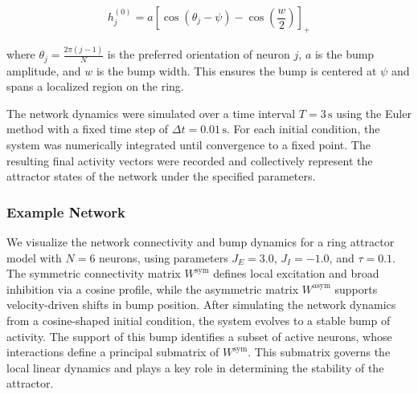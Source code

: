 \documentclass[11pt,a4paper]{article}
\begin{document}
\begin{equation}
h_j^{(0)} = a \left[\cos(\theta_j - \psi) - \cos\left(\frac{w}{2}\right)\right]_+
\end{equation}


where $\theta_j = \frac{2\pi(j-1)}{N}$ is the preferred orientation of neuron $j$, $a$ is the bump amplitude, and $w$ is the bump width. This ensures the bump is centered at $\psi$ and spans a localized region on the ring.

The network dynamics were simulated over a time interval $T = 3\,\text{s}$ using the Euler method with a fixed time step of $\Delta t = 0.01\,\text{s}$. For each initial condition, the system was numerically integrated until convergence to a fixed point. The resulting final activity vectors were recorded and collectively represent the attractor states of the network under the specified parameters.

\subsubsection*{Example Network}

We visualize the network connectivity and bump dynamics for a ring attractor model with $N = 6$ neurons, using parameters $J_E = 3.0$, $J_I = -1.0$, and $\tau = 0.1$. The symmetric connectivity matrix $W^{\text{sym}}$ defines local excitation and broad inhibition via a cosine profile, while the asymmetric matrix $W^{\text{asym}}$ supports velocity-driven shifts in bump position. After simulating the network dynamics from a cosine-shaped initial condition, the system evolves to a stable bump of activity. The support of this bump identifies a subset of active neurons, whose interactions define a principal submatrix of $W^{\text{sym}}$. This submatrix governs the local linear dynamics and plays a key role in determining the stability of the attractor.
\end{document}
